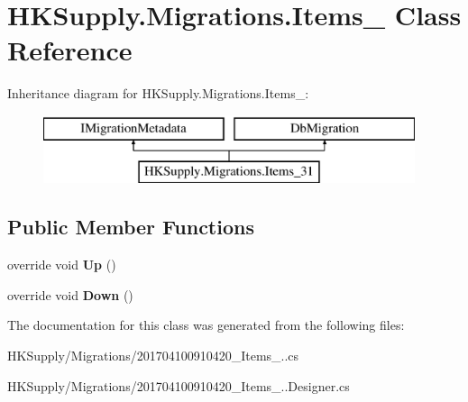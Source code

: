 \hypertarget{class_h_k_supply_1_1_migrations_1_1_items__31}{}\section{H\+K\+Supply.\+Migrations.\+Items\+\_ Class Reference}
\label{class_h_k_supply_1_1_migrations_1_1_items__31}
Inheritance diagram for H\+K\+Supply.\+Migrations.\+Items\+\_\+:\begin{figure}[H]
\begin{center}
\leavevmode
\includegraphics[height=2.000000cm]{class_h_k_supply_1_1_migrations_1_1_items__31}
\end{center}
\end{figure}
\subsection*{Public Member Functions}
\begin{DoxyCompactItemize}
\item 
\mbox{\label{class_h_k_supply_1_1_migrations_1_1_items__31_ab165cdd1d1f0fce5a83f72eaeb42b6ee}} 
override void {\bfseries Up} ()
\item 
\mbox{\label{class_h_k_supply_1_1_migrations_1_1_items__31_ad278f7fa06c22254740f9aa2cfb3a858}} 
override void {\bfseries Down} ()
\end{DoxyCompactItemize}


The documentation for this class was generated from the following files\+:\begin{DoxyCompactItemize}
\item 
H\+K\+Supply/\+Migrations/201704100910420\+\_\+\+Items\+\_..\+cs\item 
H\+K\+Supply/\+Migrations/201704100910420\+\_\+\+Items\+\_..\+Designer.\+cs\end{DoxyCompactItemize}
